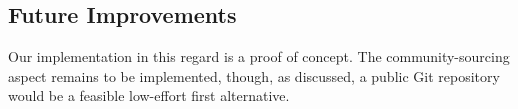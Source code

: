 \subsection{Future Improvements}\label{future-improvements}

Our implementation in this regard is a proof of concept. The
community-sourcing aspect remains to be implemented, though, as
discussed, a public Git repository would be a feasible low-effort first
alternative.
